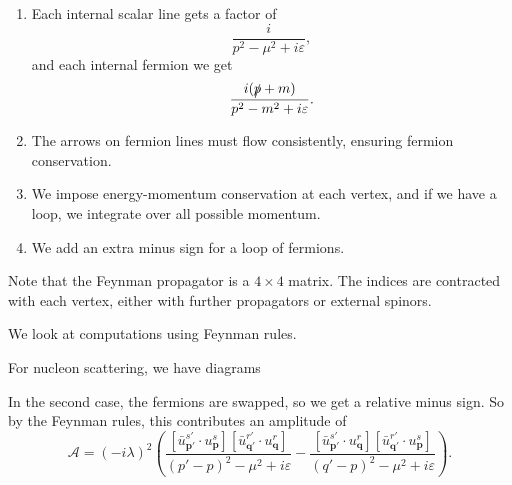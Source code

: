 \documentclass[a4paper]{article}
\begin{document}
\begin{enumerate}
  \item Each internal scalar line gets a factor of
    \[
      \frac{i}{p^2 - \mu^2 + i \varepsilon},
    \]
    and each internal fermion we get
    \[
      \frac{i(\slashed p + m)}{p^2 - m^2 + i \varepsilon}.
    \]
  \item The arrows on fermion lines must flow consistently, ensuring fermion conservation.
  \item We impose energy-momentum conservation at each vertex, and if we have a loop, we integrate over all possible momentum.
  \item We add an extra minus sign for a loop of fermions.
\end{enumerate}
Note that the Feynman propagator is a $4 \times 4$ matrix. The indices are contracted with each vertex, either with further propagators or external spinors.

We look at computations using Feynman rules.
\begin{eg}
  For nucleon scattering, we have diagrams
  \begin{center}
    \quad\quad
  \end{center}
  In the second case, the fermions are swapped, so we get a relative minus sign. So by the Feynman rules, this contributes an amplitude of
  \[
    \mathcal{A} = (-i \lambda)^2 \left( \frac{[\bar u_{\mathbf{p}'}^{s'} \cdot u_\mathbf{p}^s][\bar u_{\mathbf{q}'}^{r'} \cdot u_\mathbf{q}^r]}{(p' - p)^2 - \mu^2 + i \varepsilon} - \frac{[\bar u_{\mathbf{p}'}^{s'} \cdot u_\mathbf{q}^r][\bar u_{\mathbf{q}'}^{r'} \cdot u_\mathbf{p}^s]}{(q' - p)^2 - \mu^2 + i \varepsilon}\right).
  \]
\end{eg}
\end{document}
